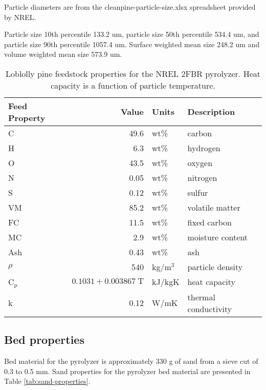 Particle diameters are from the cleanpine-particle-size.xlsx spreadsheet provided by NREL.

Particle size 10th percentile 133.2 um, particle size 50th percentile 534.4 um, and particle size 90th percentile 1057.4 um. Surface weighted mean size 248.2 um and volume weighted mean size 573.9 um.

\begin{table}[H]
    \centering
    \caption{Loblolly pine feedstock properties for the NREL 2FBR pyrolyzer. Heat capacity is a function of particle temperature.}
    \label{tab:feedstock}
    \begin{tabular}{lrll}
        \toprule
        Feed Property & Value & Units & Description \\
        \midrule
        C & 49.6 & wt\% & carbon \cite{Iisa-2016} \\
        H & 6.3 & wt\% & hydrogen \cite{Iisa-2016} \\
        O & 43.5 & wt\% & oxygen \cite{Iisa-2016} \\
        N & 0.05 & wt\% & nitrogen \cite{Iisa-2016} \\
        S & 0.12 & wt\% & sulfur \cite{Iisa-2016} \\
        VM & 85.2 & wt\% & volatile matter \cite{Iisa-2016} \\
        FC & 11.5 & wt\% & fixed carbon \cite{Iisa-2016} \\
        MC & 2.9 & wt\% & moisture content \cite{Iisa-2016} \\
        Ash & 0.43 & wt\% & ash \cite{Iisa-2016} \\
        $\rho$ & 540 & kg/m$^3$ & particle density \cite{WoodHandbook-2010} \\
        C$_\textrm{p}$ & $0.1031 + 0.003867\;\textrm{T}$ & kJ/kgK & heat capacity \cite{WoodHandbook-2010} \\
        k & 0.12 & W/mK & thermal conductivity \cite{WoodHandbook-2010} \\
        \bottomrule
    \end{tabular}
\end{table}

\subsection{Bed properties}

Bed material for the pyrolyzer is approximately 330 g of sand from a sieve cut of 0.3 to 0.5 mm. Sand properties for the pyrolyzer bed material are presented in Table \ref{tab:sand-properties}.

